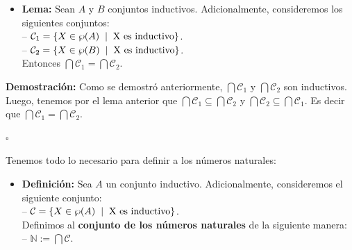 \documentclass[10 pt]{article}
\begin{document}
{\begin{itemize}
    \item \Large{\textbf{Lema:} Sean $A$ y $B$ conjuntos inductivos. Adicionalmente, consideremos los siguientes conjuntos: \\

    -- $\mathcal C_1=\{X \in \wp(A) \hspace{0.2 cm}|\hspace{0.2 cm} \text{X es inductivo}\}$. \\

    -- $\mathcal C_2=\{X \in \wp(B) \hspace{0.2 cm}|\hspace{0.2 cm}\text{X es inductivo}\}$. \\

    Entonces $\bigcap \mathcal C_1=\bigcap \mathcal C_2$.} \\
\end{itemize}

\Large{\textbf{Demostración:} Como se demostró anteriormente, $\bigcap \mathcal C_1$ y $\bigcap \mathcal C_2$ son inductivos. Luego, tenemos por el lema anterior que $\bigcap \mathcal C_1 \subseteq \bigcap \mathcal C_2$ y $\bigcap \mathcal C_2 \subseteq \bigcap \mathcal C_1$. Es decir que $\bigcap \mathcal C_1=\bigcap \mathcal C_2$.} \\

\begin{flushright}
    $\square$
\end{flushright}

\Large{Tenemos todo lo necesario para definir a los números naturales:} \\

\begin{itemize}
    \item \Large{\textbf{Definición:} Sea $A$ un conjunto inductivo. Adicionalmente, consideremos el siguiente conjunto: \\

    -- $\mathcal C=\{X \in \wp(A) \hspace{0.2 cm}| \hspace{0.2 cm} \text{X es inductivo}\}$. \\

    Definimos al \textbf{conjunto de los números naturales} de la siguiente manera: \\

    -- $\mathbb N:=\bigcap \mathcal C$.} \\
\end{itemize}

}
\end{document}
